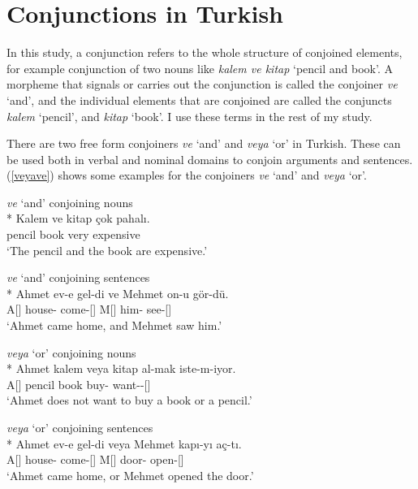 \section{Conjunctions in Turkish}

In this study, a conjunction refers to the whole structure of conjoined elements, for example conjunction of two nouns like \textit{kalem ve kitap} `pencil and book'. A morpheme that signals or carries out the conjunction is called the conjoiner \textit{ve} `and', and the individual elements that are conjoined are called the conjuncts \textit{kalem} `pencil', and \textit{kitap} `book'. I use these terms in the rest of my study.

There are two free form conjoiners \textit{ve} `and' and \textit{veya} `or' in Turkish. These can be used both in verbal and nominal domains to conjoin arguments and sentences. (\ref{veyave}) shows some examples for the conjoiners \textit{ve} `and' and \textit{veya} `or'.

\begin{exe}
    \ex \label{veyave}
    \begin{xlist}
        \ex \textit{ve} `and' conjoining nouns\\*
        \gll Kalem ve kitap çok pahalı. \\ 
        pencil {\And} book very expensive \\
        \glt `The pencil and the book are expensive.'
        
        \ex \textit{ve} `and' conjoining sentences\\*
        \gll Ahmet ev-e gel-di ve Mehmet on-u gör-dü. \\
        A[{\Nom}] house-{\Dat} come-{\Pst}[{\Tsg}] {\And} M[{\Nom}] him-{\Acc} see-{\Pst}[{\Tsg}] \\
        \glt `Ahmet came home, and Mehmet saw him.'
    
        \ex \textit{veya} `or' conjoining nouns\\*
        \gll Ahmet kalem veya kitap al-mak iste-m-iyor. \\ 
        A[{\Nom}] pencil {\Or} book buy-{\Nmlz} want-{\Neg}-{\Prog}[{\Tsg}] \\
        \glt `Ahmet does not want to buy a book or a pencil.'
        
        \ex \textit{veya} `or' conjoining sentences\\*
        \gll Ahmet ev-e gel-di veya Mehmet kapı-yı aç-tı. \\
        A[{\Nom}] house-{\Dat} come-{\Pst}[{\Tsg}] {\Or} M[{\Nom}] door-{\Acc} open-{\Pst}[{\Tsg}] \\
        \glt `Ahmet came home, or Mehmet opened the door.'
    \end{xlist}
\end{exe}

